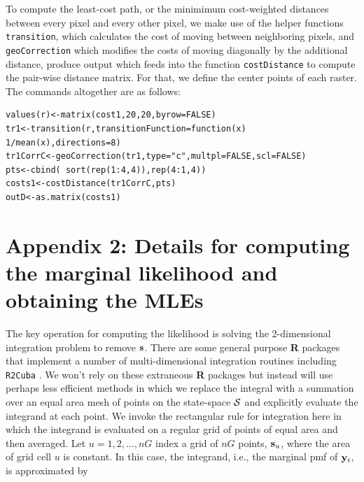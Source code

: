 \documentclass[12pt]{article}
\begin{document}
\begin{spacing}{1.2}
To compute the least-cost path, or the minimimum cost-weighted
distances between every pixel and every other pixel, we make use of 
the helper functions \mbox{\tt transition}, which
calculates the cost of moving between neighboring pixels, and
\mbox{\tt geoCorrection} which modifies the costs of moving diagonally
by the additional distance, produce output which feeds into the
function \mbox{\tt costDistance} to compute the pair-wise distance
matrix. For that, we define the center points of each raster.  The
commands altogether are as follows:

\begin{verbatim}
values(r)<-matrix(cost1,20,20,byrow=FALSE)
tr1<-transition(r,transitionFunction=function(x) 1/mean(x),directions=8)
tr1CorrC<-geoCorrection(tr1,type="c",multpl=FALSE,scl=FALSE)
pts<-cbind( sort(rep(1:4,4)),rep(4:1,4))
costs1<-costDistance(tr1CorrC,pts)
outD<-as.matrix(costs1)
\end{verbatim}


\section*{Appendix 2: Details for computing the marginal likelihood
  and obtaining the MLEs}


The key operation for computing the likelihood is solving the
2-dimensional integration problem to remove ${\bf s}$. There are some
general purpose {\bf R} packages that implement a number of
multi-dimensional integration routines including 
\mbox{\tt R2Cuba} \citep{hahn_etal:2011}.
We won't rely on these extraneous {\bf R} packages but instead will
use perhaps less efficient methods in which we replace the integral
with a summation over an equal area mesh of points on the state-space
${\cal S}$ and explicitly evaluate the integrand at each point. We
invoke the rectangular rule for integration here in which the
integrand is evaluated on a regular grid of points of equal area and
then averaged.  Let $u=1,2,\ldots,nG$ index a grid of $nG$ points,
${\bf s}_{u}$, where the area of grid cell $u$ is constant.  In this
case, the integrand, i.e., the marginal pmf of ${\bf y}_{i}$, is
approximated by


\end{spacing}
\end{document}
